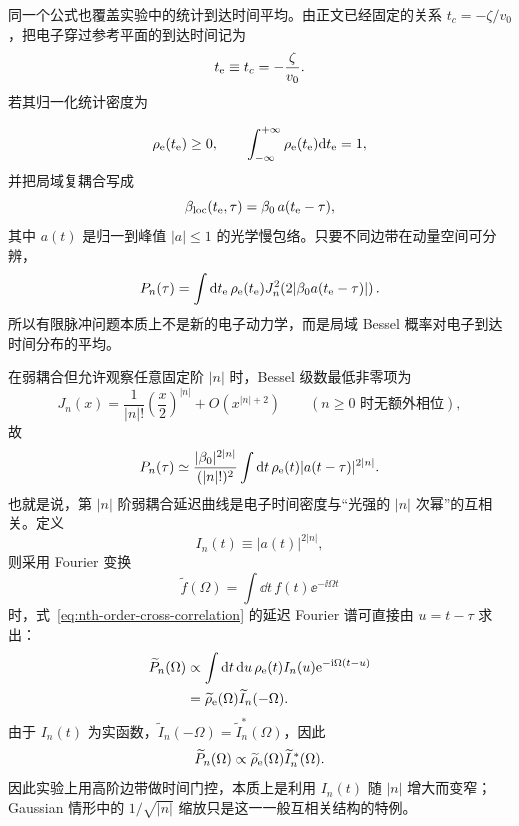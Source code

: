 同一个公式也覆盖实验中的统计到达时间平均。由正文已经固定的关系 $t_c=-\zeta/v_0$，把电子穿过参考平面的到达时间记为
\begin{equation}
 t_{\rm e}\equiv t_c=-\frac{\zeta}{v_0}.
 \label{eq:arrival-time-zeta}
\end{equation}
若其归一化统计密度为

\begin{equation}
 \rho_{\rm e}(t_{\rm e})\ge0,
 \qquad
 \int_{-\infty}^{+\infty}\rho_{\rm e}(t_{\rm e})\mathrm{d} t_{\rm e}=1,
 \label{eq:general-electron-time-density}
\end{equation}
并把局域复耦合写成
\begin{equation}
 \beta_{\rm loc}(t_{\rm e},\tau)
 =\beta_0\,a(t_{\rm e}-\tau),
 \label{eq:general-pulse-local-beta}
\end{equation}
其中 $a(t)$ 是归一到峰值 $|a|\le1$ 的光学慢包络。只要不同边带在动量空间可分辨，
\begin{equation}
 {
 P_n(\tau)=\int\mathrm{d}t_{\rm e}\,
 \rho_{\rm e}(t_{\rm e})
 J_n^2\!\left(2|\beta_0a(t_{\rm e}-\tau)|\right).}
 \label{eq:general-pulse-convolution}
\end{equation}
所以有限脉冲问题本质上不是新的电子动力学，而是局域 Bessel 概率对电子到达时间分布的平均。

在弱耦合但允许观察任意固定阶 $|n|$ 时，Bessel 级数最低非零项为
\begin{equation}
 J_n(x)
 =\frac{1}{|n|!}\left(\frac{x}{2}\right)^{|n|}
 +O\!\left(x^{|n|+2}\right)
 \qquad (n\ge0\text{ 时无额外相位}),
 \label{eq:bessel-fixed-order-weak}
\end{equation}
故
\begin{equation}
 {
 P_n(\tau)
 \simeq
 \frac{|\beta_0|^{2|n|}}{(|n|!)^2}
 \int\mathrm{d}t\,
 \rho_{\rm e}(t)
 |a(t-\tau)|^{2|n|}.}
 \label{eq:nth-order-cross-correlation}
\end{equation}
也就是说，第 $|n|$ 阶弱耦合延迟曲线是电子时间密度与“光强的 $|n|$ 次幂”的互相关。定义
\begin{equation}
 I_n(t)\equiv|a(t)|^{2|n|},
\end{equation}
则采用 Fourier 变换
\begin{equation}
 \widetilde f(\Omega)=\int\dd t\,f(t)\ee^{-\ii\Omega t}
\end{equation}
时，式~\cref{eq:nth-order-cross-correlation} 的延迟 Fourier 谱可直接由 $u=t-\tau$ 求出：
\begin{align}
\widetilde P_n(\Omega)
&\propto\int\mathrm{d} t\,\mathrm{d} u\,
\rho_{\rm e}(t)I_n(u)
\mathrm{e}^{-\mathrm{i}\Omega(t-u)}\\
&=\widetilde\rho_{\rm e}(\Omega)
\widetilde I_n(-\Omega).
\end{align}
由于 $I_n(t)$ 为实函数，$\widetilde I_n(-\Omega)=\widetilde I_n^*(\Omega)$，因此
\begin{equation}
 {
 \widetilde P_n(\Omega)
 \propto
 \widetilde\rho_{\rm e}(\Omega)
 \widetilde I_n^{\,*}(\Omega).}
 \label{eq:delay-cross-correlation-fourier}
\end{equation}
因此实验上用高阶边带做时间门控，本质上是利用 $I_n(t)$ 随 $|n|$ 增大而变窄；Gaussian 情形中的 $1/\sqrt{|n|}$ 缩放只是这一一般互相关结构的特例。


